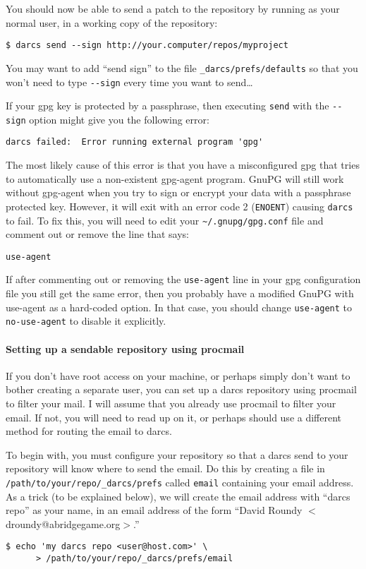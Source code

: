 \documentclass{book}
\begin{document}
You should now be able to send a patch to the repository by running as your
normal user, in a working copy of the repository:
\begin{verbatim}
$ darcs send --sign http://your.computer/repos/myproject
\end{verbatim}
You may want to add ``send sign'' to the file \verb!_darcs/prefs/defaults!
so that you won't need to type \verb!--sign! every time you want to
send\ldots

If your gpg key is protected by a passphrase, then executing \verb!send!
with the \verb!--sign! option might give you the following error:
\begin{verbatim}
darcs failed:  Error running external program 'gpg'
\end{verbatim}
The most likely cause of this error is that you have a misconfigured
gpg that tries to automatically use a non-existent gpg-agent
program. GnuPG will still work without gpg-agent when you try to sign
or encrypt your data with a passphrase protected key. However, it will
exit with an error code 2 (\verb!ENOENT!) causing \verb!darcs! to
fail. To fix this, you will need to edit your \verb!~/.gnupg/gpg.conf!
file and comment out or remove the line that says:
\begin{verbatim}
use-agent
\end{verbatim}
If after commenting out or removing the \verb!use-agent! line in your
gpg configuration file you still get the same error, then you probably
have a modified GnuPG with use-agent as a hard-coded option. In that
case, you should change \verb!use-agent! to \verb!no-use-agent! to
disable it explicitly.

\paragraph{Setting up a sendable repository using procmail}
If you don't have root access on your machine, or perhaps simply don't want
to bother creating a separate user, you can set up a darcs repository using
procmail to filter your mail.  I will assume that you already use procmail
to filter your email.  If not, you will need to read up on it, or perhaps
should use a different method for routing the email to darcs.

To begin with, you must configure your repository so that a darcs send to
your repository will know where to send the email.  Do this by creating a
file in \verb!/path/to/your/repo/_darcs/prefs! called \verb!email!
containing your email address.  As a trick (to be explained below), we will
create the email address with ``darcs repo'' as your name, in an email
address of the form ``David Roundy $<$droundy@abridgegame.org$>$.''
\begin{verbatim}
$ echo 'my darcs repo <user@host.com>' \
      > /path/to/your/repo/_darcs/prefs/email
\end{verbatim}
\end{document}
